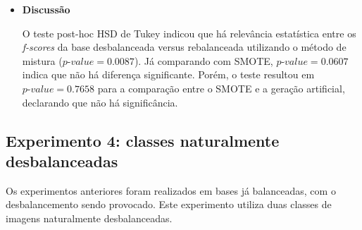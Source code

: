 \begin{itemize}
\item[] \textbf{Discussão}

O teste post-hoc HSD de Tukey indicou que há relevância estatística entre os \textit{f-scores} da base desbalanceada versus rebalanceada utilizando o método de mistura ($ \textit{p-value} = 0.0087$). Já comparando com SMOTE, $\textit{p-value} = 0.0607$ indica que não há diferença significante. Porém, o teste resultou em $\textit{p-value} = 0.7658$ para a comparação entre o SMOTE e a geração artificial, declarando que não há significância.


\end{itemize}
\FloatBarrier
\subsection{Experimento 4: classes naturalmente desbalanceadas}

Os experimentos anteriores foram realizados em bases já balanceadas, com o desbalancemento sendo provocado. Este experimento utiliza duas classes de imagens naturalmente desbalanceadas.


